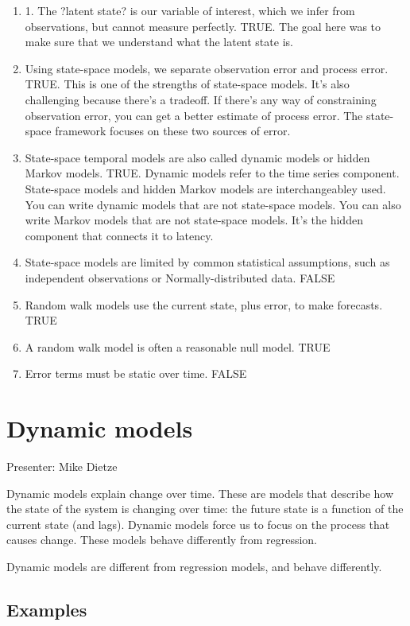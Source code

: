 \documentclass[12pt, oneside]{article}   	%
\begin{document}
\begin{enumerate}
\item 1. The ?latent state? is our variable of interest, which we infer from observations, but cannot measure perfectly. TRUE. The goal here was to make sure that we understand what the latent state is. 
\item Using state-space models, we separate observation error and process error. TRUE. This is one of the strengths of state-space models. It's also challenging because there's a tradeoff. If there's any way of constraining observation error, you can get a better estimate of process error. The state-space framework focuses on these two sources of error.
\item State-space temporal models are also called dynamic models or hidden Markov models. TRUE. Dynamic models refer to the time series component. State-space models and hidden Markov models are interchangeabley used. You can write dynamic models that are not state-space models. You can also write Markov models that are not state-space models. It's the hidden component that connects it to latency.
\item State-space models are limited by common statistical assumptions, such as independent observations or Normally-distributed data. FALSE
\item Random walk models use the current state, plus error, to make forecasts. TRUE
\item A random walk model is often a reasonable null model. TRUE
\item Error terms must be static over time. FALSE
\end{enumerate}

\section{Dynamic models}

Presenter: Mike Dietze

Dynamic models explain change over time. These are models that describe how the state of the system is changing over time: the future state is a function of the current state (and lags). Dynamic models force us to focus on the process that causes change. These models behave differently from regression. 

Dynamic models are different from regression models, and behave differently.

\subsection{Examples}
\end{document}
